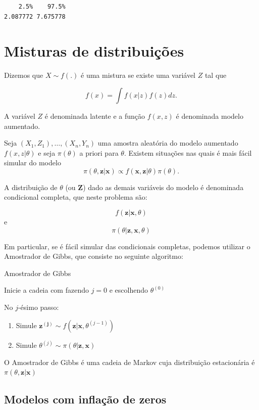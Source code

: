\documentclass[
  letterpaper,
  DIV=11,
  numbers=noendperiod]{scrreprt}
\theoremstyle{plain}
\theoremstyle{definition}
\theoremstyle{definition}
\theoremstyle{remark}
\begin{document}
\begin{verbatim}
    2.5%    97.5% 
2.087772 7.675778 
\end{verbatim}


\chapter{Misturas de
distribuições}\label{misturas-de-distribuiuxe7uxf5es}

Dizemos que \(X\sim f(.)\) é uma mistura se existe uma variável \(Z\)
tal que

\[f(x)=\int f(x|z)f(z)dz.\]

A variável \(Z\) é denominada latente e a função \(f(x,z)\) é denominada
modelo aumentado.

Seja \((X_1,Z_1),\ldots,(X_n,Y_n)\) uma amostra aleatória do modelo
aumentado \(f(x,z|\theta)\) e seja \(\pi(\theta)\) a priori para
\(\theta\). Existem situações nas quais é mais fácil simular do modelo
\[\pi(\theta,\boldsymbol{z}|\boldsymbol{x})\varpropto f(\boldsymbol{x},\boldsymbol{z}|\theta)\pi(\theta).\]

A distribuição de \(\theta\) (ou \(\boldsymbol{Z}\)) dado as demais
variáveis do modelo é denominada condicional completa, que neste
problema são:

\[f(\boldsymbol{z}|\boldsymbol{x},\theta)\] e
\[\pi(\theta|\boldsymbol{z},\boldsymbol{x},\theta)\]

Em particular, se é fácil simular das condicionais completas, podemos
utilizar o Amostrador de Gibbs, que consiste no seguinte algoritmo:

Amostrador de Gibbs

Inicie a cadeia com fazendo \(j=0\) e escolhendo \(\theta^{(0)}\)

No \(j\)-ésimo passo:

\begin{enumerate}
\def\labelenumi{\arabic{enumi}.}
\item
  Simule
  \(\boldsymbol{z^{(j)}}\sim f(\boldsymbol{z}|\boldsymbol{x},\theta^{(j-1)})\)
\item
  Simule \(\theta^{(j)}\sim \pi(\theta|\boldsymbol{z},\boldsymbol{x})\)
\end{enumerate}

O Amostrador de Gibbs é uma cadeia de Markov cuja distribuição
estacionária é \(\pi(\theta,\boldsymbol{z}|\boldsymbol{x})\)

\section{Modelos com inflação de
zeros}\label{modelos-com-inflauxe7uxe3o-de-zeros}
\end{document}

